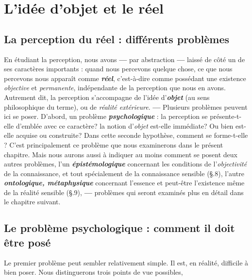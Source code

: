 \chapter{L'idée d'objet et le réel}
\addtocounter{chapitre}{1}
%

\section{La perception du réel : différents problèmes}%
En étudiant la perception, nous avons {\bf —} par abstraction {\bf —} laissé de
côté un de ses caractères importants : quand nous percevons quelque
chose, ce que nous percevons nous apparaît comme \textbf{\textit {réel}}, c’est-à-dire
comme possédant une existence {\it objective} et {\it permanente}, indépendante
de la perception que nous en avons. Autrement dit, la perception
s'accompagne de l’idée d'\textbf{\textit {objet}} (au sens philosophique du terme),
ou de {\it réalité extérieure}. {\bf —} Plusieurs problèmes peuvent ici se
poser. D’abord, un problème \textbf{\textit {psychologique}} : la perception se
présente-t-elle d'emblée avec ce caractère? la notion d’{\it objet} est-elle
immédiate? Ou bien est-elle acquise ou construite? Dans cette
seconde hypothèse, comment se forme-t-elle ? C’est principalement
ce problème que nous examinerons dans le présent chapitre. Mais
nous aurons aussi à indiquer au moins comment se posent deux autres
problèmes, l’un \textbf{\textit {épistémologique}} concernant les conditions de l’{\it objectivité}
de la connaissance, et tout spécialement de la connaissance
sensible
(\S \thechapitre .8),
l’autre \textbf{\textit {ontologique, métaphysique}} concernant l’essence
et peut-être l’existence même de la réalité sensible
(\S \thechapitre .9),
{\bf —} problèmes
qui seront examinés plus en détail dans le chapitre suivant.

\section{Le problème psychologique : comment il doit être posé}%
Le premier problème peut sembler relativement simple. Il est,
en réalité, difficile à bien poser. Nous distinguerons trois points de
vue possibles,

